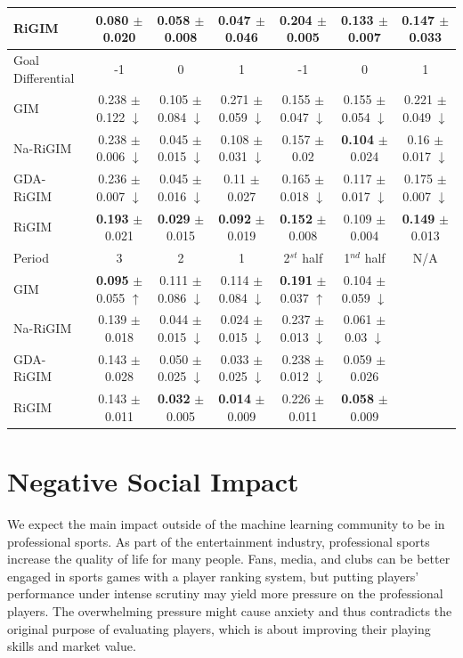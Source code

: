\documentclass{article}
\begin{document}
\begin{table}[htbp]
{\begin{tabular}{l|ccc:ccc}
RiGIM & {\bf 0.080} $\pm$ 0.020 & {\bf 0.058} $\pm$ 0.008 & 0.047 $\pm$ 0.046 & {\bf 0.204} $\pm$ 0.005 & 0.133 $\pm$ 0.007 & {\bf 0.147} $\pm$ 0.033\\ \hline\hline
 Goal Differential & -1 & 0 & 1 & -1 & 0 & 1 \\\hline
GIM  & 0.238 $\pm$ 0.122 $\downarrow$ & 0.105 $\pm$ 0.084 $\downarrow$ & 0.271 $\pm$ 0.059 $\downarrow$ & 0.155 $\pm$ 0.047 $\downarrow$ & 0.155 $\pm$ 0.054 $\downarrow$ & 0.221 $\pm$ 0.049 $\downarrow$ \\
Na-RiGIM  & 0.238 $\pm$ 0.006 $\downarrow$ & 0.045 $\pm$ 0.015 $\downarrow$ & 0.108 $\pm$ 0.031 $\downarrow$ & 0.157 $\pm$ 0.02 & {\bf 0.104} $\pm$ 0.024 & 0.16 $\pm$ 0.017 $\downarrow$\\
GDA-RiGIM & 0.236 $\pm$ 0.007 $\downarrow$ & 0.045 $\pm$ 0.016 $\downarrow$ & 0.11 $\pm$ 0.027 & 0.165 $\pm$ 0.018 $\downarrow$ & 0.117 $\pm$ 0.017 $\downarrow$ & 0.175 $\pm$ 0.007 $\downarrow$\\
RiGIM & {\bf 0.193} $\pm$ 0.021 & {\bf 0.029} $\pm$ 0.015 & {\bf 0.092} $\pm$ 0.019 & {\bf 0.152} $\pm$ 0.008 & 0.109 $\pm$ 0.004 & {\bf 0.149} $\pm$ 0.013\\ \hline\hline
Period & 3 & 2 & 1 & 2$^{st}$ half
& 1$^{nd}$ half & N/A \\\hline
GIM & {\bf 0.095} $\pm$ 0.055 $\uparrow$ & 0.111 $\pm$ 0.086 $\downarrow$ & 0.114 $\pm$ 0.084 $\downarrow$ & {\bf 0.191} $\pm$ 0.037 $\uparrow$ & 0.104 $\pm$ 0.059 $\downarrow$ \\
Na-RiGIM  & 0.139 $\pm$ 0.018 & 0.044 $\pm$ 0.015 $\downarrow$ & 0.024 $\pm$ 0.015 $\downarrow$ & 0.237 $\pm$ 0.013 $\downarrow$ & 0.061 $\pm$ 0.03 $\downarrow$ \\
GDA-RiGIM & 0.143 $\pm$ 0.028 & 0.050 $\pm$ 0.025 $\downarrow$ & 0.033 $\pm$ 0.025 $\downarrow$ & 0.238 $\pm$ 0.012 $\downarrow$ & 0.059 $\pm$ 0.026\\
RiGIM & 0.143 $\pm$ 0.011 & {\bf 0.032} $\pm$ 0.005 & {\bf 0.014} $\pm$ 0.009  & 0.226 $\pm$ 0.011 & {\bf 0.058} $\pm$ 0.009\\ \bottomrule
\end{tabular}
}
\end{table}


\section{Negative Social Impact}
We expect the main impact outside of the machine learning community to be in professional sports. As part of the entertainment industry, professional sports increase the quality of life for many people. Fans, media, and clubs can be better engaged in sports games with a player ranking system, but putting players’ performance under intense scrutiny may yield more pressure on the professional players. The overwhelming pressure might cause anxiety and thus contradicts the original purpose of evaluating players, which is about improving their playing skills and market value.
\end{document}
